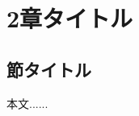 \documentclass[a4paper,11pt,onecolumn]{jsarticle}
\begin{document}
\section{2章タイトル}
\subsection{節タイトル}
本文......
\end{document}
